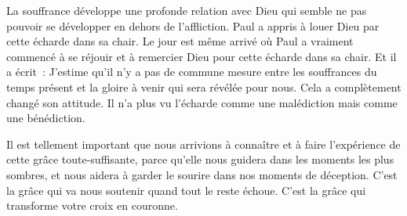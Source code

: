 
La souffrance développe une profonde relation avec Dieu qui semble
 ne pas pouvoir se développer en dehors de l'affliction.
 Paul a appris à louer Dieu par cette écharde dans sa chair.
 Le jour est même arrivé où Paul a vraiment commencé à se réjouir
 et à remercier Dieu pour cette écharde dans sa chair.
 Et il a écrit~: 
 \og J'estime qu'il n'y a pas de commune mesure entre les souffrances
 du temps présent et la gloire à venir qui sera révélée pour nous. \fg{}
 Cela a complètement changé son attitude. Il n'a plus vu l'écharde
 comme une malédiction mais comme une bénédiction.

Il est tellement important que nous arrivions à connaître
 et à faire l'expérience de cette grâce toute-suffisante,
 parce qu'elle nous guidera dans les moments les plus sombres,
 et nous aidera à garder le sourire dans nos moments de déception.
 C'est la grâce qui va nous soutenir quand tout le reste échoue.
 C'est la grâce qui transforme votre croix en couronne.

\dvrule



